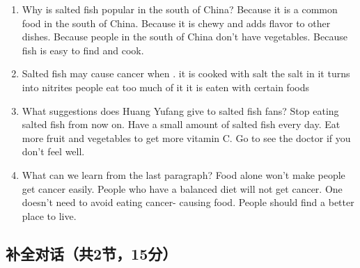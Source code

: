 \documentclass{ExamJHSEngl}
\begin{document}
\begin{enumerate}[resume,ref={\arabic*},labelsep=-0.1em]

\item[\choice{B}] Why is salted fish popular in the south of China?
\options
  {Because it is a common food in the south of China.}
  {Because it is chewy and adds flavor to other dishes.}
  {Because people in the south of China don’t have vegetables.}
  {Because fish is easy to find and cook.}

\item[\choice{C}] Salted fish may cause cancer when \blank.
\options
  {it is cooked with salt}
  {the salt in it turns into nitrites}
  {people eat too much of it}
  {it is eaten with certain foods}

\item[\choice{C}] What suggestions does Huang Yufang give to salted fish fans?
\options
  {Stop eating salted fish from now on.}
  {Have a small amount of salted fish every day.}
  {Eat more fruit and vegetables to get more vitamin C.}
  {Go to see the doctor if you don't feel well. }

\item[\choice{A}] What can we learn from the last paragraph?
\options
  {Food alone won't make people get cancer easily.}
  {People who have a balanced diet will not get cancer.}
  {One doesn't need to avoid eating cancer- causing food.}
  {People should find a better place to live.}

\end{enumerate}


\subsection{补全对话（共2节，15分）}

\end{document}
